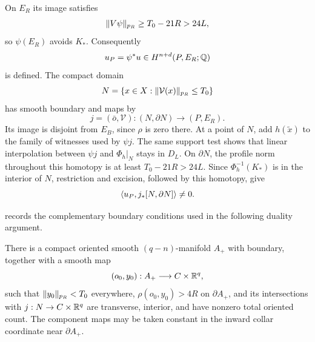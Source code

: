 On $E_R$ its image satisfies
\[
 \lVert V\psi\rVert_{p_R}\ge T_0-21R>24L,
\]
so $\psi(E_R)$ avoids $K_*$.  Consequently
\[
 u_P=\psi^*u\in H^{n+d}(P,E_R;\mathbb Q)
\]
is defined.  The compact domain
\[
 N=\{x\in X:\lVert\mathcal V(x)\rVert_{p_R}\le T_0\}
\]
has smooth boundary and maps by
\[
 j=(\bar o,\mathcal V):(N,\partial N)\longrightarrow(P,E_R).
\]
Its image is disjoint from $E_B$, since $\rho$ is zero there.  At a
point of $N$, add $h(\widetilde x)$ to the family of witnesses used
by $\psi j$.  The same support test shows that linear interpolation
between $\psi j$ and $\Phi_h|_N$ stays in $D_L$.  On $\partial N$,
the profile norm throughout this homotopy is at least $T_0-21R>24L$.
Since $\Phi_h^{-1}(K_*)$ is in the interior of $N$, restriction and
excision, followed by this homotopy, give
\begin{equation}
\label{eq:relative-pairing}
 \langle u_P,j_*[N,\partial N]\rangle\ne0.
\end{equation}

 records the complementary boundary conditions
used in the following duality argument.

\begin{lemma}
\label{lem:relative-degree}
There is a compact oriented smooth $(q-n)$-manifold $A_+$ with
boundary, together with a smooth map
\[
 (o_0,y_0):A_+\longrightarrow C\times\mathbb R^q,
\]
such that $\lVert y_0\rVert_{p_R}<T_0$ everywhere,
$\rho(o_0,y_0)>4R$ on $\partial A_+$, and its intersections with
$j:N\to C\times\mathbb R^q$ are transverse, interior, and have nonzero
total oriented count.  The component maps may be taken constant in
the inward collar coordinate near $\partial A_+$.
\end{lemma}

